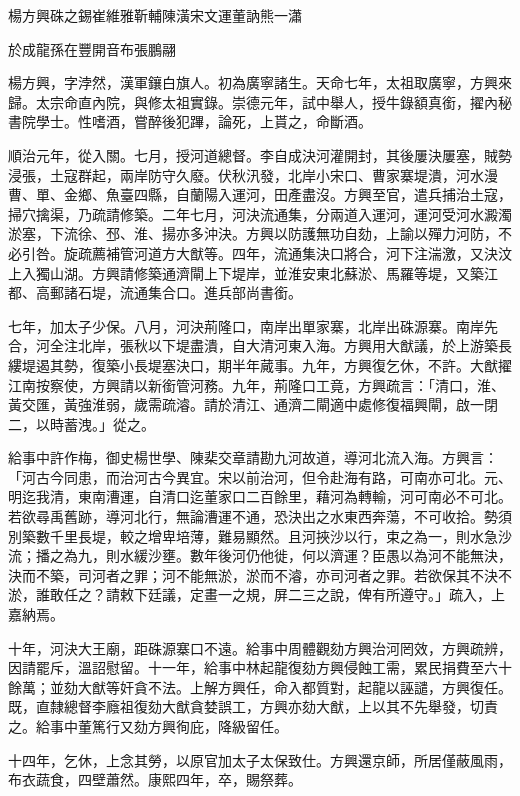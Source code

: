 
\begin{pinyinscope}
楊方興硃之錫崔維雅靳輔陳潢宋文運董訥熊一瀟

於成龍孫在豐開音布張鵬翮

楊方興，字浡然，漢軍鑲白旗人。初為廣寧諸生。天命七年，太祖取廣寧，方興來歸。太宗命直內院，與修太祖實錄。崇德元年，試中舉人，授牛錄額真銜，擢內秘書院學士。性嗜酒，嘗醉後犯蹕，論死，上貰之，命斷酒。

順治元年，從入關。七月，授河道總督。李自成決河灌開封，其後屢決屢塞，賊勢浸張，土寇群起，兩岸防守久廢。伏秋汛發，北岸小宋口、曹家寨堤潰，河水漫曹、單、金鄉、魚臺四縣，自蘭陽入運河，田產盡沒。方興至官，遣兵捕治土寇，掃穴擒渠，乃疏請修築。二年七月，河決流通集，分兩道入運河，運河受河水澱濁淤塞，下流徐、邳、淮、揚亦多沖決。方興以防護無功自劾，上諭以殫力河防，不必引咎。旋疏薦補管河道方大猷等。四年，流通集決口將合，河下注湍激，又決汶上入獨山湖。方興請修築通濟閘上下堤岸，並淮安東北蘇淤、馬羅等堤，又築江都、高郵諸石堤，流通集合口。進兵部尚書銜。

七年，加太子少保。八月，河決荊隆口，南岸出單家寨，北岸出硃源寨。南岸先合，河全注北岸，張秋以下堤盡潰，自大清河東入海。方興用大猷議，於上游築長縷堤遏其勢，復築小長堤塞決口，期半年蕆事。九年，方興復乞休，不許。大猷擢江南按察使，方興請以新銜管河務。九年，荊隆口工竟，方興疏言：「清口，淮、黃交匯，黃強淮弱，歲需疏濬。請於清江、通濟二閘適中處修復福興閘，啟一閉二，以時蓄洩。」從之。

給事中許作梅，御史楊世學、陳棐交章請勘九河故道，導河北流入海。方興言：「河古今同患，而治河古今異宜。宋以前治河，但令赴海有路，可南亦可北。元、明迄我清，東南漕運，自清口迄董家口二百餘里，藉河為轉輸，河可南必不可北。若欲尋禹舊跡，導河北行，無論漕運不通，恐決出之水東西奔蕩，不可收拾。勢須別築數千里長堤，較之增卑培薄，難易顯然。且河挾沙以行，束之為一，則水急沙流；播之為九，則水緩沙壅。數年後河仍他徙，何以濟運？臣愚以為河不能無決，決而不築，司河者之罪；河不能無淤，淤而不濬，亦司河者之罪。若欲保其不決不淤，誰敢任之？請敕下廷議，定畫一之規，屏二三之說，俾有所遵守。」疏入，上嘉納焉。

十年，河決大王廟，距硃源寨口不遠。給事中周體觀劾方興治河罔效，方興疏辨，因請罷斥，溫詔慰留。十一年，給事中林起龍復劾方興侵蝕工需，累民捐費至六十餘萬；並劾大猷等奸貪不法。上解方興任，命入都質對，起龍以誣譴，方興復任。既，直隸總督李廕祖復劾大猷貪婪誤工，方興亦劾大猷，上以其不先舉發，切責之。給事中董篤行又劾方興徇庇，降級留任。

十四年，乞休，上念其勞，以原官加太子太保致仕。方興還京師，所居僅蔽風雨，布衣蔬食，四壁蕭然。康熙四年，卒，賜祭葬。


\end{pinyinscope}

